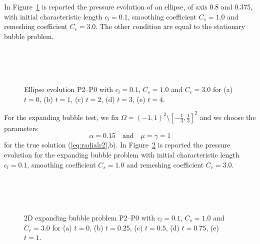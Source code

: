 \documentclass[a4paper,12pt,onecolumn]{article}
\begin{document}
In Figure~\ref{fig:ellipse} is reported the pressure evolution of an ellipse, of axis 0.8 and 0.375, with initial characteristic length $c_l=0.1$, smoothing coefficient $C_s=1.0$ and remeshing coefficient $C_r=3.0$. The other condition are equal to the stationary bubble problem.

\begin{figure}[htbp]
  \centering
  \\
  \quad
  \\
  \quad
  \\
  \caption{Ellipse evolution P2--P0 with $c_l=0.1$, $C_s=1.0$ and $C_r=3.0$ for (a) $t=0$, (b) $t=1$, (c) $t=2$, (d) $t=3$, (e) $t=4$.}
  \label{fig:ellipse}
\end{figure}

For the expanding bubble test, we fix $\Omega = (-1,1)^2 \setminus [-\frac13,\frac13]^2$ and we choose the parameters
\begin{equation*}
\alpha = 0.15 \quad\text{and}\quad \mu = \gamma = 1
\end{equation*}
for the true solution (\ref{eq:radialr2},b). In Figure~\ref{fig:expanding_bubble} is reported the pressure evolution for the expanding bubble problem with initial characteristic length $c_l=0.1$, smoothing coefficient $C_s=1.0$ and remeshing coefficient $C_r=3.0$.

\begin{figure}[htbp]
  \centering
  \\
  \quad
  \\
  \quad
  \\
  \caption{2D expanding bubble problem P2--P0 with $c_l=0.1$, $C_s=1.0$ and $C_r=3.0$ for (a) $t=0$, (b) $t=0.25$, (c) $t=0.5$, (d) $t=0.75$, (e) $t=1$.}
  \label{fig:expanding_bubble}
\end{figure}
\end{document}
